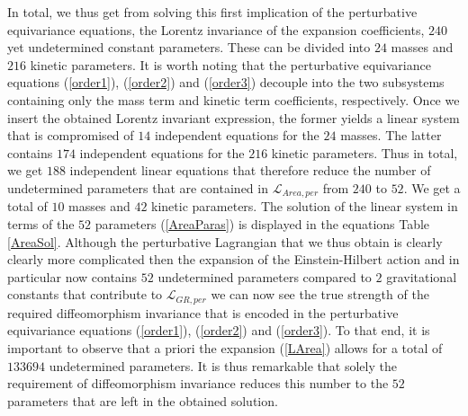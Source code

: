 \documentclass[a4paper,12pt, DIV=14, BCOR=5mm, twoside, headsepline, numbers=noenddot]{scrbook}
\begin{document}
In total, we thus get from solving this first implication of the perturbative equivariance equations, the Lorentz invariance of the expansion coefficients, $240$ yet undetermined constant parameters. These can be divided into $24$ masses and $216$ kinetic parameters. It is worth noting that the perturbative equivariance equations (\ref{order1}), (\ref{order2}) and (\ref{order3}) decouple into the two subsystems containing only the mass term and kinetic term coefficients, respectively. Once we insert the obtained Lorentz invariant expression, the former yields a linear system that is compromised of $14$ independent equations for the $24$ masses. The latter contains $174$ independent equations for the $216$ kinetic parameters. Thus in total, we get $188$ independent linear equations that therefore reduce the number of undetermined parameters that are contained in $\mathcal{L}_{Area,per}$ from $240$ to $52$. We get a total of $10$ masses and $42$ kinetic parameters. The solution of the linear system in terms of the $52$ parameters (\ref{AreaParas}) is displayed in the equations Table \ref{AreaSol}. Although the perturbative Lagrangian that we thus obtain is clearly clearly more complicated then the expansion of the Einstein-Hilbert action and in particular now contains $52$ undetermined parameters compared to $2$ gravitational constants that contribute to $\mathcal{L}_{GR,per}$ we can now see the true strength of the required diffeomorphism invariance that is encoded in the perturbative equivariance equations (\ref{order1}), (\ref{order2}) and (\ref{order3}). To that end, it is important to observe that a priori the expansion (\ref{LArea}) allows for a total of $133694$ undetermined parameters. It is thus remarkable that solely the requirement of diffeomorphism invariance reduces this number to the $52$ parameters that are left in the obtained solution. 
\end{document}
